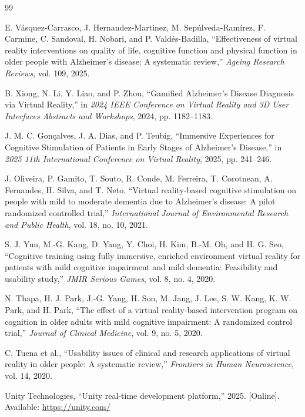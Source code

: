 \documentclass[12pt,a4paper,oneside]{report}
\begin{document}
\begin{thebibliography}{99}

E. Vásquez-Carrasco, J. Hernandez-Martinez, M. Sepúlveda-Ramírez, F. Carmine, C. Sandoval, H. Nobari, and P. Valdés-Badilla, ``Effectiveness of virtual reality interventions on quality of life, cognitive function and physical function in older people with Alzheimer's disease: A systematic review,'' \textit{Ageing Research Reviews}, vol. 109, 2025.

B. Xiong, N. Li, Y. Liao, and P. Zhou, ``Gamified Alzheimer's Disease Diagnosis via Virtual Reality,'' in \textit{2024 IEEE Conference on Virtual Reality and 3D User Interfaces Abstracts and Workshops}, 2024, pp. 1182--1183.

J. M. C. Gonçalves, J. A. Dias, and P. Teubig, ``Immersive Experiences for Cognitive Stimulation of Patients in Early Stages of Alzheimer's Disease,'' in \textit{2025 11th International Conference on Virtual Reality}, 2025, pp. 241--246.

J. Oliveira, P. Gamito, T. Souto, R. Conde, M. Ferreira, T. Corotnean, A. Fernandes, H. Silva, and T. Neto, ``Virtual reality-based cognitive stimulation on people with mild to moderate dementia due to Alzheimer's disease: A pilot randomized controlled trial,'' \textit{International Journal of Environmental Research and Public Health}, vol. 18, no. 10, 2021.

S. J. Yun, M.-G. Kang, D. Yang, Y. Choi, H. Kim, B.-M. Oh, and H. G. Seo, ``Cognitive training using fully immersive, enriched environment virtual reality for patients with mild cognitive impairment and mild dementia: Feasibility and usability study,'' \textit{JMIR Serious Games}, vol. 8, no. 4, 2020.

N. Thapa, H. J. Park, J.-G. Yang, H. Son, M. Jang, J. Lee, S. W. Kang, K. W. Park, and H. Park, ``The effect of a virtual reality-based intervention program on cognition in older adults with mild cognitive impairment: A randomized control trial,'' \textit{Journal of Clinical Medicine}, vol. 9, no. 5, 2020.

C. Tuena et al., ``Usability issues of clinical and research applications of virtual reality in older people: A systematic review,'' \textit{Frontiers in Human Neuroscience}, vol. 14, 2020.

Unity Technologies, ``Unity real-time development platform,'' 2025. [Online]. Available: \url{https://unity.com/}


\end{thebibliography}
\end{document}
